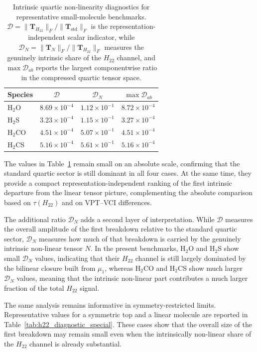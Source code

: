 \documentclass[aip,jcp,reprint,floatfix]{revtex4-2}
\begin{document}
\begin{table}[t]
\centering
\caption{Intrinsic quartic non-linearity diagnostics for representative
small-molecule benchmarks. $\mathcal D =
\|\mathbf T_{H_{22}}\|_F / \|\mathbf T_{\mathrm{std}}\|_F$ is the
representation-independent scalar indicator, while
$\mathcal D_N = \|\mathbf T_N\|_F / \|\mathbf T_{H_{22}}\|_F$ measures
the genuinely intrinsic share of the $H_{22}$ channel, and
$\max \mathcal D_{ab}$ reports the largest componentwise ratio in the
compressed quartic tensor space.}
\begin{tabular}{lccc}
\hline
Species & $\mathcal D$ & $\mathcal D_N$ & $\max \mathcal D_{ab}$ \\
\hline
H$_2$O  & $8.69\times10^{-4}$ & $1.12\times10^{-1}$ & $8.72\times10^{-4}$ \\
H$_2$S  & $3.23\times10^{-4}$ & $1.15\times10^{-1}$ & $3.27\times10^{-4}$ \\
H$_2$CO & $4.51\times10^{-4}$ & $5.07\times10^{-1}$ & $4.51\times10^{-4}$ \\
H$_2$CS & $5.16\times10^{-4}$ & $5.61\times10^{-1}$ & $5.16\times10^{-4}$ \\
\hline
\end{tabular}
\label{tab:h22_diagnostic_small}
\end{table}

The values in Table~\ref{tab:h22_diagnostic_small} remain small on an
absolute scale, confirming that the standard quartic sector is still
dominant in all four cases. At the same time, they provide a compact
representation-independent ranking of the first intrinsic departure
from the linear tensor picture, complementing the absolute comparison
based on $\tau(H_{22})$ and on VPT--VCI differences.

The additional ratio $\mathcal D_N$ adds a second layer of
interpretation. While $\mathcal D$ measures the overall amplitude of
the first breakdown relative to the standard quartic sector,
$\mathcal D_N$ measures how much of that breakdown is carried by the
genuinely intrinsic non-linear tensor $N$. In the present benchmarks,
H$_2$O and H$_2$S show small $\mathcal D_N$ values, indicating that
their $H_{22}$ channel is still largely dominated by the bilinear
closure built from $\mu_1$, whereas H$_2$CO and H$_2$CS show much
larger $\mathcal D_N$ values, meaning that the intrinsic non-linear
part contributes a much larger fraction of the total $H_{22}$ signal.

The same analysis remains informative in symmetry-restricted limits.
Representative values for a symmetric top and a linear molecule are
reported in Table~\ref{tab:h22_diagnostic_special}. These cases show
that the overall size of the first breakdown may remain small even
when the intrinsically non-linear share of the $H_{22}$ channel is
already substantial.
\end{document}
